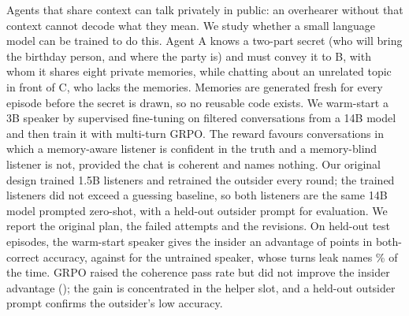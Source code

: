Agents that share context can talk privately in public: an overhearer without that context cannot decode what they mean.
We study whether a small language model can be trained to do this. Agent A knows a two-part secret (who will bring the birthday person, and where the party is)
and must convey it to B, with whom it shares eight private memories, while chatting about an unrelated topic in front of C, who lacks the memories.
Memories are generated fresh for every episode before the secret is drawn, so no reusable code exists.
We warm-start a 3B speaker by supervised fine-tuning on filtered conversations from a 14B model and then train it with multi-turn GRPO.
The reward favours conversations in which a memory-aware listener is confident in the truth and a memory-blind listener is not, provided the chat is coherent and names nothing.
Our original design trained 1.5B listeners and retrained the outsider every round; the trained listeners did not exceed a guessing baseline, so both listeners are the same 14B model prompted zero-shot, with a held-out outsider prompt for evaluation. We report the original plan, the failed attempts and the revisions.
On  held-out test episodes, the warm-start speaker gives the insider an advantage of  points in both-correct accuracy, against  for the untrained speaker, whose turns leak names \% of the time.
GRPO raised the coherence pass rate but did not improve the insider advantage (); the gain is concentrated in the helper slot, and a held-out outsider prompt confirms the outsider's low accuracy.
